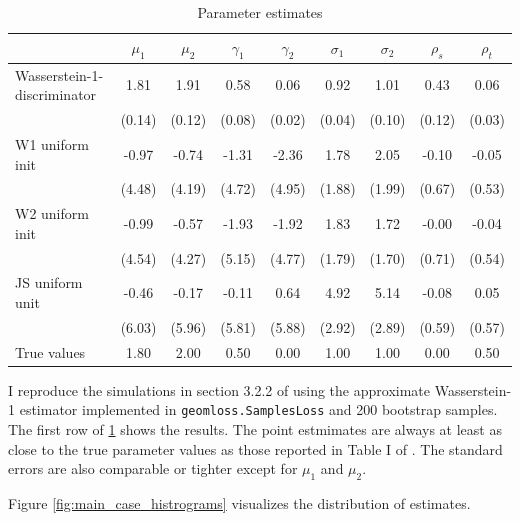\begin{table}
    \centering
    \begin{tabular}{lcccccccc} %
    \toprule
    & $\mu_1$ & $\mu_2$ & $\gamma_1$ & $\gamma_2$ & $\sigma_1$ & $\sigma_2$ & $\rho_s$ & $\rho_t$ \\
    \midrule
    Wasserstein-1-discriminator & 1.81 & 1.91 & 0.58 & 0.06 & 0.92 & 1.01 & 0.43 & 0.06 \\
    & (0.14) & (0.12) & (0.08) & (0.02) & (0.04) & (0.10) & (0.12) & (0.03) \\
    \midrule
    W1 uniform init & -0.97 & -0.74 & -1.31 & -2.36 & 1.78 & 2.05 & -0.10 & -0.05 \\
    & (4.48) & (4.19) & (4.72) & (4.95) & (1.88) & (1.99) & (0.67) & (0.53) \\
    \midrule
    W2 uniform init & -0.99 & -0.57 & -1.93 & -1.92 & 1.83 & 1.72 & -0.00 & -0.04 \\
    & (4.54) & (4.27) & (5.15) & (4.77) & (1.79) & (1.70) & (0.71) & (0.54) \\
    \midrule
    JS uniform unit & -0.46 & -0.17 & -0.11 & 0.64 & 4.92 & 5.14 & -0.08 & 0.05 \\
    & (6.03) & (5.96) & (5.81) & (5.88) & (2.92) & (2.89) & (0.59) & (0.57) \\
    \midrule
    True values & 1.80 & 2.00 & 0.50 & 0.00 & 1.00 & 1.00 & 0.00 & 0.50 \\ 
    \bottomrule
    \end{tabular}
    \caption{Parameter estimates}
    \label{tab:parameter_estimates}
\end{table}

I reproduce the simulations in section 3.2.2 of \textcite{kaji2023adversarial} using the approximate Wasserstein-1 estimator implemented in \texttt{geomloss.SamplesLoss} and 200 bootstrap samples.
The first row of \ref{tab:parameter_estimates} shows the results.
The point estmimates are always at least as close to the true parameter values as those reported in Table I of \cite{kaji2023adversarial}.
The standard errors are also comparable or tighter except for $\mu_1$ and $\mu_2$.

Figure \ref{fig:main_case_histrograms} visualizes the distribution of estimates.

